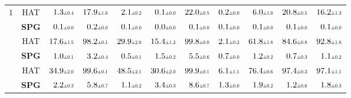 \begin{table}[p]
\begin{minipage}{.85\hsize}
{\begin{tabular}{ccrrrrrrrrr}
\multirow{2}{*}{$1$}
& HAT & 
$1.3\std{0.4}$ & $17.9\std{1.0}$ & 
$2.1\std{0.2}$ & $0.1\std{0.0}$ &
$22.0\std{0.5}$ & 
$0.2\std{0.0}$ & $6.0\std{1.0}$ &
$20.8\std{0.5}$ & $16.2\std{1.3}$ \\
& \textbf{SPG} & 
$0.1\std{0.0}$ & $0.2\std{0.0}$ &
$0.1\std{0.0}$ & $0.0\std{0.0}$ &
$0.1\std{0.0}$ &
$0.1\std{0.0}$ & $0.1\std{0.0}$ &
$0.1\std{0.0}$ & $0.1\std{0.0}$ \\

\hdashline

\multirow{2}{*}{$T/2$}
& HAT & 
$17.6\std{1.5}$ & $98.2\std{0.1}$ &
$29.9\std{2.0}$ & $15.4\std{1.2}$ &
$99.8\std{0.0}$ &
$2.1\std{0.2}$ & $61.8\std{1.8}$ &
$84.6\std{0.8}$ & $92.8\std{1.8}$ \\
& \textbf{SPG} & 
$1.0\std{0.1}$ & $3.2\std{0.4}$ &
$0.5\std{0.1}$ & $1.5\std{0.2}$ &
$5.5\std{0.6}$ &
$0.7\std{0.0}$ & $1.2\std{0.2}$ &
$0.7\std{0.3}$ & $1.1\std{0.2}$ \\

\hdashline

\multirow{2}{*}{$T$}
& HAT & 
$34.9\std{2.0}$ & $99.6\std{0.1}$ &
$48.5\std{2.1}$ & $30.6\std{2.0}$ &
$99.9\std{0.1}$ & 
$6.1\std{1.1}$ & $76.4\std{0.6}$ &
$97.4\std{0.3}$ & $97.1\std{1.1}$ \\
& \textbf{SPG} & 
$2.2\std{0.3}$ & $5.8\std{0.7}$ &
$1.1\std{0.2}$ & $3.4\std{0.3}$ &
$8.6\std{0.7}$ &
$1.3\std{0.0}$ & $1.9\std{0.2}$ &
$1.2\std{0.6}$ & $1.8\std{0.3}$ \\

\bottomrule
\end{tabular}
}
\end{minipage}


\end{table}

